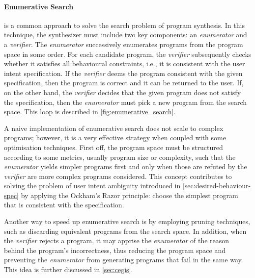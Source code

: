 \paragraph{Enumerative Search}\label{sec:enum-search}
\cite{DBLP:conf/pldi/FengMGDC17,DBLP:conf/pldi/FengMBD18,AlphaRegex16,Orvalho19,DBLP:conf/cav/ReynoldsBNBT19,DBLP:journals/pvldb/OrvalhoTVMM20} is a common approach to solve the search problem of program synthesis. In this technique, the synthesizer must include two key components: an \textit{enumerator} and a \textit{verifier}.
The \textit{enumerator} successively enumerates programs from the program space in some order. For each candidate program, the \textit{verifier} subsequently checks whether it satisfies all behavioural constraints, i.e., it is consistent with the user intent specification.
If the \textit{verifier} deems the program consistent with the given specification, then the program is correct and it can be returned to the user.
If, on the other hand, the \textit{verifier} decides that the given program does not satisfy the specification, then the \textit{enumerator} must pick a new program from the search space.
This loop is described in \autoref{fig:enumerative_search}.

A naive implementation of enumerative search does not scale to complex programs; however, it is a very effective strategy when coupled with some optimisation techniques. First off, the program space must be structured according to some metrics, usually program size or complexity, such that the \textit{enumerator} yields simpler programs first and only when those are refuted by the \textit{verifier} are more complex programs considered. This concept contributes to solving the problem of user intent ambiguity introduced in \autoref{sec:desired-behaviour-spec} by applying the Ockham's Razor principle: choose the simplest program that is consistent with the specification.

Another way to speed up enumerative search is by employing pruning techniques, such as discarding equivalent programs from the search space.
In addition, when the \textit{verifier} rejects a program, it may apprise the \textit{enumerator} of the reason behind the program's incorrectness, thus reducing the program space and preventing the \textit{enumerator} from generating programs that fail in the same way.
This idea is further discussed in \autoref{sec:cegis}.


